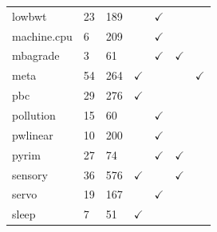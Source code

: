 \documentclass[12pt]{article}
\begin{document}
\begin{table}[!t]
\begin{tabular}{l|l|l|c|c|c|c}
lowbwt                                       & 23                                            & 189                                            &          &$\checkmark$         &        &            \\
machine.cpu                                  & 6                                             & 209                                            &          &$\checkmark$         &        &            \\
mbagrade                                     & 3                                             & 61                                             &          &$\checkmark$         &$\checkmark$     &            \\
meta                                         & 54                                            & 264                                            &$\checkmark$       &            &        &$\checkmark$         \\
pbc                                          & 29                                            & 276                                            &$\checkmark$       &            &        &            \\
pollution                                    & 15                                            & 60                                             &          &$\checkmark$         &        &            \\
pwlinear                                     & 10                                            & 200                                            &          &$\checkmark$         &        &            \\
pyrim                                        & 27                                            & 74                                             &          &$\checkmark$         &$\checkmark$     &            \\
sensory                                      & 36                                            & 576                                            &$\checkmark$       &            &$\checkmark$     &            \\
servo                                        & 19                                            & 167                                            &          &$\checkmark$         &        &            \\
sleep                                        & 7                                             & 51                                             &$\checkmark$       &            &        &            \\

\end{tabular}
\end{table}
\end{document}
